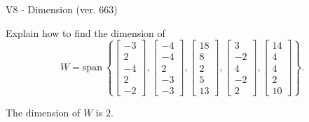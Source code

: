 \begin{exercise}
  \begin{exerciseTitle}V8 - Dimension (ver. 663)\end{exerciseTitle}
  \begin{exerciseStatement}
    Explain how to find the dimension of 
\[W=\mathrm{span}\ \left\{\left[\begin{array}{r}
-3 \\
2 \\
-4 \\
2 \\
-2
\end{array}\right] , \left[\begin{array}{r}
-4 \\
-4 \\
2 \\
-3 \\
-3
\end{array}\right] , \left[\begin{array}{r}
18 \\
8 \\
2 \\
5 \\
13
\end{array}\right] , \left[\begin{array}{r}
3 \\
-2 \\
4 \\
-2 \\
2
\end{array}\right] , \left[\begin{array}{r}
14 \\
4 \\
4 \\
2 \\
10
\end{array}\right]\right\}.\]



  \end{exerciseStatement}
  \begin{exerciseAnswer}
   The dimension of \(W\) is  \(2\).
  


  \end{exerciseAnswer}
\end{exercise}